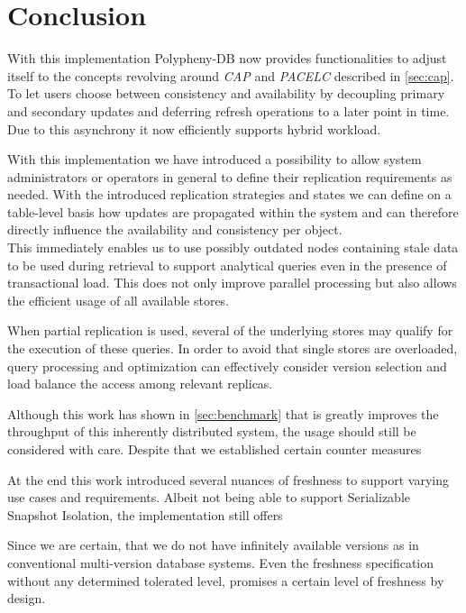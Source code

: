 \chapter{Conclusion}
\label{c:conclusion}


With this implementation Polypheny-DB now provides functionalities to adjust itself to the concepts revolving around \emph{CAP} and \emph{PACELC} described in \ref{sec:cap}.
To let users choose between consistency and availability by decoupling primary and secondary updates and deferring refresh operations to a later point in time.
Due to this asynchrony it now efficiently supports hybrid workload. 


With this implementation we have introduced a possibility to allow system administrators or operators in general to define their replication requirements as needed. 
With the introduced replication strategies and states we can define on a table-level basis how updates are propagated within the system and can therefore directly influence 
the availability and consistency per object.\\
This immediately enables us to use possibly outdated nodes containing stale data to be used during retrieval to support analytical queries even in the presence of transactional load.
This does not only improve parallel processing but also allows the efficient usage of all available stores.





When partial replication is used, several of the underlying stores may qualify
for the execution of these queries. In order to avoid that single stores are overloaded, query processing and optimization
can effectively consider version selection and load balance the access among relevant replicas.

Although this work has shown in \ref{sec:benchmark} that is greatly improves the throughput of this inherently distributed system, the usage should still be considered with care.
Despite that we established certain counter measures 


At the end this work introduced several nuances of freshness to support varying use cases and requirements.
Albeit not being able to support Serializable Snapshot Isolation, the implementation still offers 

Since we are certain, that we do not have infinitely available versions as in conventional multi-version database systems.
Even the freshness specification without any determined tolerated level, promises a certain level of freshness by design.


